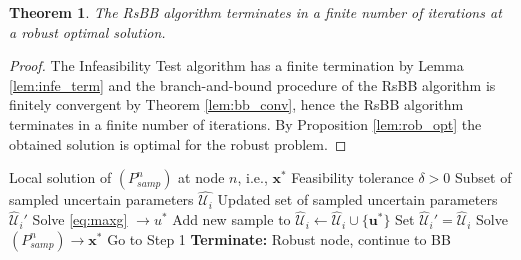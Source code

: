 \documentclass[sn-mathphys-num]{sn-jnl}
\newtheorem{theorem}{Theorem}%
\begin{document}
\begin{theorem}
    The RsBB algorithm terminates in a finite number of iterations at a robust optimal solution.
\end{theorem}

\begin{proof}
    The Infeasibility Test algorithm has a finite termination by Lemma \ref{lem:infe_term} and the branch-and-bound procedure of the RsBB algorithm is finitely convergent by Theorem \ref{lem:bb_conv}, hence the RsBB algorithm terminates in a finite number of iterations. By Proposition \ref{lem:rob_opt} the obtained solution is optimal for the robust problem.
\end{proof}

\begin{algorithm}
\caption{Infeasibility Test Algorithm}
\label{alg:InfesTest}
\begin{algorithmic}[1] %
    \Require Local solution of $(P_{samp}^n)$ at node $n$, i.e., $\bm x^*$
    \Require Feasibility tolerance $\delta>0$
    \Require Subset of sampled uncertain parameters $\hat{\mathcal{U}_i}$
    \Ensure Updated set of sampled uncertain parameters $\hat{\mathcal{U}}_i'$
    \State Solve \eqref{eq:maxg} $\rightarrow u^*$
        \State Add new sample to $\hat{\mathcal{U}}_i \leftarrow \hat{\mathcal{U}}_i \cup \{\bm u^*\}$
    \EndIf
    \EndFor
{}
       \State Set $\hat{\mathcal{U}}_i'= \hat{\mathcal{U}}_i$
        \State Solve $(P_{samp}^n) \rightarrow \bm x^*$
        \State Go to Step 1
    \EndIf
    \State \textbf{Terminate:} Robust node, continue to BB
\end{algorithmic}
\end{algorithm}
\end{document}
